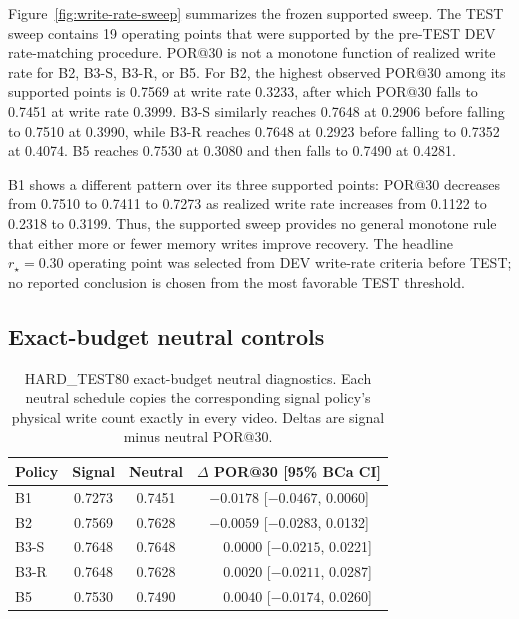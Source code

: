 \documentclass[10pt,twocolumn,letterpaper]{article}
\begin{document}
Figure~\ref{fig:write-rate-sweep} summarizes the frozen supported sweep.
The TEST sweep contains 19 operating points that were supported by
the pre-TEST DEV rate-matching procedure.  POR@30 is not a monotone function
of realized write rate for B2, B3-S, B3-R, or B5.  For B2, the highest
observed POR@30 among its supported points is 0.7569 at write rate 0.3233,
after which POR@30 falls to 0.7451 at write rate 0.3999.  B3-S similarly
reaches 0.7648 at 0.2906 before falling to 0.7510 at 0.3990, while B3-R
reaches 0.7648 at 0.2923 before falling to 0.7352 at 0.4074.  B5 reaches
0.7530 at 0.3080 and then falls to 0.7490 at 0.4281.

B1 shows a different pattern over its three supported points: POR@30
decreases from 0.7510 to 0.7411 to 0.7273 as realized write rate increases
from 0.1122 to 0.2318 to 0.3199.  Thus, the supported sweep provides no
general monotone rule that either more or fewer memory writes improve
recovery.  The headline \(r_\star=0.30\) operating point was selected from
DEV write-rate criteria before TEST; no reported conclusion is chosen from
the most favorable TEST threshold.

\subsection{Exact-budget neutral controls}

\begin{table}[t]
\centering
\setlength{\tabcolsep}{5pt}
\caption{HARD\_TEST80 exact-budget neutral diagnostics.  Each neutral
schedule copies the corresponding signal policy's physical write count
exactly in every video.  Deltas are signal minus neutral POR@30.}
\label{tab:neutral-main}
\begin{tabular}{lccc}
\toprule
Policy & Signal & Neutral & $\Delta$ POR@30 [95\% BCa CI] \\
\midrule
B1   & 0.7273 & 0.7451 & $-0.0178$ [$-0.0467$, 0.0060] \\
B2   & 0.7569 & 0.7628 & $-0.0059$ [$-0.0283$, 0.0132] \\
B3-S & 0.7648 & 0.7648 & $\phantom{-}0.0000$ [$-0.0215$, 0.0221] \\
B3-R & 0.7648 & 0.7628 & $\phantom{-}0.0020$ [$-0.0211$, 0.0287] \\
B5   & 0.7530 & 0.7490 & $\phantom{-}0.0040$ [$-0.0174$, 0.0260] \\
\bottomrule
\end{tabular}
\end{table}
\end{document}

